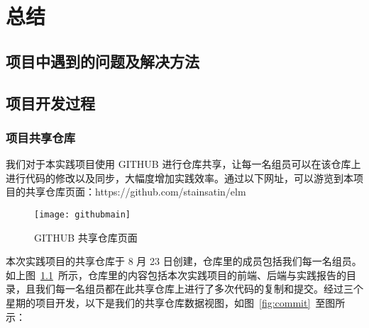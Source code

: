 \chapter{总结}

\section{项目中遇到的问题及解决方法}

\section{项目开发过程}
\subsection{项目共享仓库}
我们对于本实践项目使用 GITHUB 进行仓库共享，让每一名组员可以在该仓库上进行代码的修改以及同步，大幅度增加实践效率。通过以下网址，可以游览到本项目的共享仓库页面：https://github.com/stainsatin/elm
\begin{figure}[htbp]
    \centering
    \texttt{[image: githubmain]}
    \caption{GITHUB 共享仓库页面}\label{fig:githubmain}
    \vspace{\baselineskip}
\end{figure}

本次实践项目的共享仓库于 8 月 23 日创建，仓库里的成员包括我们每一名组员。如上图~\ref{fig:githubmain}~所示，仓库里的内容包括本次实践项目的前端、后端与实践报告的目录，且我们每一名组员都在此共享仓库上进行了多次代码的复制和提交。经过三个星期的项目开发，以下是我们的共享仓库数据视图，如图~\ref{fig:commit}~至图所示：

